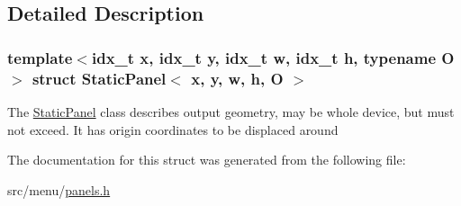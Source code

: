 \subsection{Detailed Description}
\subsubsection*{template$<$idx\+\_\+t x, idx\+\_\+t y, idx\+\_\+t w, idx\+\_\+t h, typename O$>$\newline
struct Static\+Panel$<$ x, y, w, h, O $>$}

The \hyperlink{structStaticPanel}{Static\+Panel} class describes output geometry, may be whole device, but must not exceed. It has origin coordinates to be displaced around 

The documentation for this struct was generated from the following file\+:\begin{DoxyCompactItemize}
\item 
src/menu/\hyperlink{panels_8h}{panels.\+h}\end{DoxyCompactItemize}
